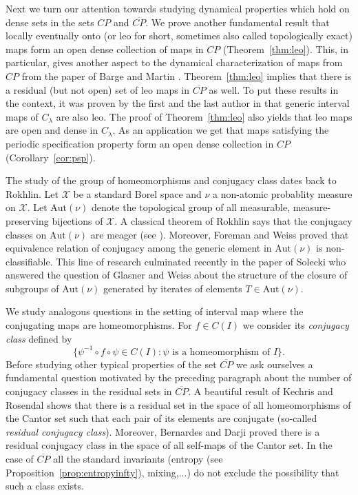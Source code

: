\documentclass[12pt, a4paper]{amsart}
\newcommand{\?}{{\bf ???}}
\def\CP{\overline{CP}}
\begin{document}
Next we turn our attention towards studying dynamical properties which hold on dense sets in the sets $CP$ and $\CP$. We prove another fundamental result that locally eventually onto (or leo for short, sometimes also called topologically exact) maps form an open dense collection of maps in $CP$ (Theorem~\ref{thm:leo}). This, in particular, gives another aspect to the dynamical characterization of maps from $CP$ from the paper of Barge and Martin \cite{BM}. Theorem~\ref{thm:leo} implies that there is a residual (but not open) set of leo maps in $\CP$ as well. To put these results in the context, it was proven by the first and the last author in \cite{BT} that generic interval maps of $C_{\lambda}$ are also leo. The proof of Theorem~\ref{thm:leo} also yields that leo maps are open and dense in $C_{\lambda}$.  As an application we get that maps satisfying the periodic specification property form an open dense collection in $CP$ (Corollary~\ref{cor:psp}). 


 The study of the group of homeomorphisms and conjugacy class dates back to Rokhlin.
 Let $\mathcal{X}$ be a standard Borel space and $\nu$ a non-atomic probablity measure on $\mathcal{X}$.
Let $\mathrm{Aut}(\nu)$ denote the topological group of all measurable, measure-preserving bijections of $\mathcal{X}$.
A classical theorem of Rokhlin  says that the conjugacy classes on $\mathrm{Aut}(\nu)$ are meager (see \cite[Theorem 2.5]{Kech}). Moreover, Foreman and Weiss \cite{FW} proved that equivalence relation of conjugacy among the generic element in $\mathrm{Aut}(\nu)$ is non-classifiable. This line of research culminated recently in the paper of Solecki \cite{Sol} who answered the question of Glasner and Weiss about the structure of the closure of subgroups of $\mathrm{Aut}(\nu)$ generated by iterates of elements $T\in \mathrm{Aut}(\nu)$.

 We study analogous questions in the setting of interval map where the conjugating maps are homeomorphisms. For $f \in C(I)$ we consider its {\it conjugacy class}  defined by 
$$\{\psi^{-1} \circ f \circ \psi \in C(I) : \psi \text{ is a homeomorphism of } I\}.$$ 
Before studying other typical properties of the set $\CP$ we ask ourselves a fundamental question motivated by the preceding paragraph about the number of conjugacy classes in the residual sets in $\CP$. A beautiful result of Kechris and Rosendal \cite{KR} shows that there is a residual set in the space of all homeomorphisms of the Cantor set such that each pair of its elements are conjugate (so-called \textit{residual conjugacy class}). Moreover, Bernardes and Darji \cite{BD} proved there is a residual conjugacy class in the space of all self-maps of the Cantor set. In the case of $\CP$ all the standard invariants (entropy (see Proposition~\ref{prop:entropyinfty}), mixing,...) do not exclude the possibility that such a class exists. 
\end{document}
